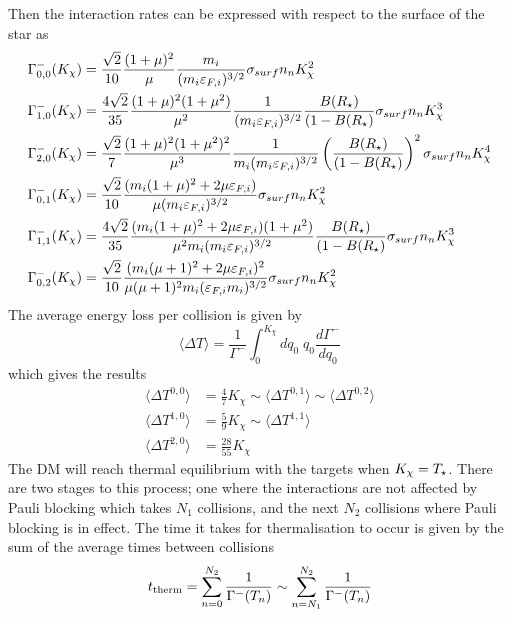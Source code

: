 Then the interaction rates can be expressed with respect to the surface of the star as
\begin{align}
    \Gamma_{0,0}^- (K_\chi) & = \frac{\sqrt{2}}{10}\frac{(1 +\mu)^2}{\mu} \frac{m_i}{(m_i \varepsilon_{F,i})^{3/2}}\sigma_{surf} n_n K_\chi^2\\
    \Gamma_{1,0}^- (K_\chi) & =\frac{4\sqrt{2}}{35}\frac{(1 + \mu)^2 (1 + \mu^2)}{\mu^2}\frac{1}{(m_i\varepsilon_{F,i})^{3/2}}\frac{B(R_\star)}{(1 - B(R_\star)}\sigma_{surf} n_n K_\chi^3\\
    \Gamma_{2,0}^- (K_\chi) & =\frac{\sqrt{2}}{7}\frac{(1 + \mu)^2 (1 + \mu^2)^2}{\mu^3}\frac{1}{m_i(m_i\varepsilon_{F,i})^{3/2}}\left( \frac{B(R_\star)}{(1 - B(R_\star)}\right)^2\sigma_{surf} n_n K_\chi^4\\
    \Gamma^-_{0,1}(K_\chi) & = \frac{\sqrt{2}}{10} \frac{(m_i(1 + \mu)^2 + 2 \mu \varepsilon_{F,i})}{\mu(m_i\varepsilon_{F,i})^{3/2}}\sigma_{surf} n_n K_\chi^2\\
    \Gamma_{1,1}^- (K_\chi) & =\frac{4\sqrt{2}}{35}\frac{(m_i(1 + \mu)^2 +2\mu\varepsilon_{F,i}) (1 + \mu^2)}{\mu^2m_i (m_i\varepsilon_{F,i})^{3/2}}\frac{B(R_\star)}{(1 - B(R_\star)}\sigma_{surf} n_n K_\chi^3\\
    \Gamma_{0,2}^- (K_\chi) & =\frac{\sqrt{2}}{10}\frac{(m_i(\mu +1)^2 + 2 \mu  \varepsilon_{F,i})^2}{\mu(\mu+1)^2 m_i (\varepsilon_{F,i}m_i)^{3/2}}\sigma_{surf} n_n K_\chi^2
\end{align}
The average energy loss per collision is given by
\begin{equation}
    \langle \Delta T \rangle = \frac{1}{\Gamma^-}\int_0^{K_\chi} dq_0\; q_0 \frac{d \Gamma^-}{d q_0}
\end{equation}
which gives the results
\begin{align}
    \langle \Delta T^{0,0} \rangle & = \frac{4}{7}K_\chi \sim \langle \Delta T^{0,1} \rangle \sim \langle \Delta T^{0,2} \rangle \\
    \langle \Delta T^{1,0} \rangle & = \frac{5}{9}K_\chi \sim \langle \Delta T^{1,1} \rangle\\
    \langle \Delta T^{2,0} \rangle & = \frac{28}{55}K_\chi 
\end{align}
The DM will reach thermal equilibrium with the targets when $K_\chi =T_\star$. There are two stages to this process; one where the interactions are not affected by Pauli blocking which takes $N_1$ collisions, and the next $N_2$ collisions where Pauli blocking is in effect. The time it takes for thermalisation to occur is given by the sum of the average times between collisions
\begin{equation}
    t_{\rm therm} = \sum_{n=0}^{N_2} \frac{1}{\Gamma^-(T_n)} \sim \sum_{n=N_1}^{N_2} \frac{1}{\Gamma^-(T_n)}
\end{equation}
